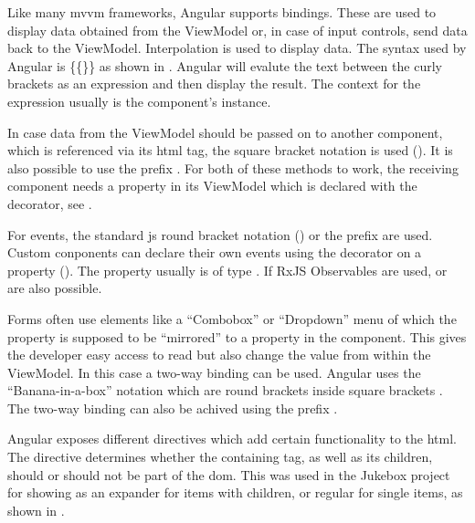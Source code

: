 
Like many \gls{mvvm} frameworks, Angular supports bindings. These are used to display data obtained from the ViewModel or, in case of input controls, send data back to the ViewModel. Interpolation is used to display data. The syntax used by Angular is \{\{\}\} as shown in . Angular will evalute the text between the curly brackets as an expression and then display the result. The context for the expression usually is the component's instance.

In case data from the ViewModel should be passed on to another component, which is referenced via its \gls{html} tag, the square bracket notation is used (). It is also possible to use the  prefix \zB {}. For both of these methods to work, the receiving component needs a property in its ViewModel which is declared with the  decorator, see .

For events, the standard \gls{js} round bracket notation () or the  prefix \zB {} are used. Custom conponents can declare their own events using the  decorator on a property (). The property usually is of type . If RxJS Observables are used,  or  are also possible.

Forms often use elements like a \enquote{Combobox} or \enquote{Dropdown} menu of which the  property is supposed to be \enquote{mirrored} to a property in the component. This gives the developer easy access to read but also change the value from within the ViewModel. In this case a two-way binding can be used. Angular uses the \enquote{Banana-in-a-box} notation which are round brackets inside square brackets \zB {}. The two-way binding can also be achived using the  prefix \zB {}.


Angular exposes different directives which add certain functionality to the \gls{html}. The  directive determines whether the containing tag, as well as its children, should or should not be part of the \gls{dom}. This was used in the Jukebox project for showing  as an expander for items with children, or regular for single items, as shown in .

